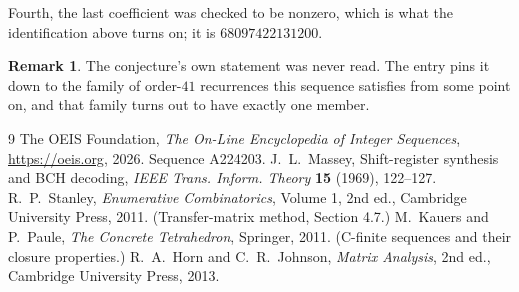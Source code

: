\documentclass[11pt,a4paper]{article}
\theoremstyle{plain}
\theoremstyle{definition}
\newtheorem{remark}[theorem]{Remark}
\begin{document}
Fourth, the last coefficient was checked to be nonzero, which is what the identification above
turns on; it is $68097422131200$.

\begin{remark}
The conjecture's own statement was never read. The entry pins it down to the family of
order-$41$ recurrences this sequence satisfies from some point on, and that family turns
out to have exactly one member.
\end{remark}

\begin{thebibliography}{9}
 The OEIS Foundation, \emph{The On-Line Encyclopedia of Integer
Sequences}, \url{https://oeis.org}, 2026. Sequence A224203.
 J.~L.~Massey, Shift-register synthesis and BCH decoding, \emph{IEEE
Trans. Inform. Theory} \textbf{15} (1969), 122--127.
 R.~P.~Stanley, \emph{Enumerative Combinatorics}, Volume 1, 2nd ed.,
Cambridge University Press, 2011. (Transfer-matrix method, Section 4.7.)
 M.~Kauers and P.~Paule, \emph{The Concrete Tetrahedron}, Springer, 2011.
(C-finite sequences and their closure properties.)
 R.~A.~Horn and C.~R.~Johnson, \emph{Matrix Analysis}, 2nd ed., Cambridge
University Press, 2013.
\end{thebibliography}
\end{document}
